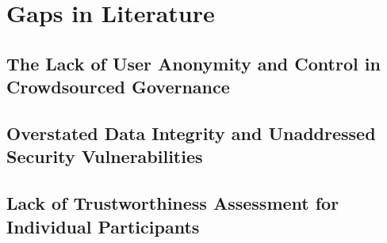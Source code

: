 




\section{Gaps in Literature}
\subsection{The Lack of User Anonymity and Control in Crowdsourced Governance}
\subsection{Overstated Data Integrity and Unaddressed Security Vulnerabilities}
\subsection{Lack of Trustworthiness Assessment for Individual Participants}
